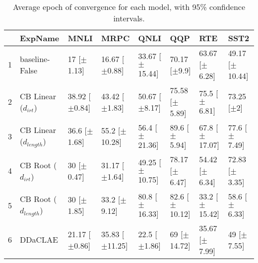 \begin{table}[ht]
\centering
\begin{tabular}{rlllllll}
  \hline
 & ExpName & MNLI & MRPC & QNLI & QQP & RTE & SST2 \\ 
  \hline
1 & baseline-False & 17 [$\pm$1.13] & 16.67 [$\pm$0.88] & 33.67 [$\pm$15.44] & 70.17 [$\pm$9.9] & 63.67 [$\pm$6.28] & 49.17 [$\pm$10.44] \\ 
  2 & CB Linear ($d_{irt}$) & 38.92 [$\pm$0.84] & 43.42 [$\pm$1.83] & 50.67 [$\pm$8.17] & 75.58 [$\pm$5.89] & 75.5 [$\pm$6.81] & 73.25 [$\pm$2] \\ 
  3 & CB Linear ($d_{length}$) & 36.6 [$\pm$1.68] & 55.2 [$\pm$10.28] & 56.4 [$\pm$21.36] & 89.6 [$\pm$5.94] & 67.8 [$\pm$17.07] & 77.6 [$\pm$7.49] \\ 
  4 & CB Root ($d_{irt}$) & 30 [$\pm$0.47] & 31.17 [$\pm$1.64] & 49.25 [$\pm$10.75] & 78.17 [$\pm$6.47] & 54.42 [$\pm$6.34] & 72.83 [$\pm$3.35] \\ 
  5 & CB Root ($d_{length}$) & 30 [$\pm$1.85] & 33.2 [$\pm$9.12] & 80.8 [$\pm$16.33] & 82.6 [$\pm$10.12] & 33.2 [$\pm$15.42] & 58.6 [$\pm$6.33] \\ 
  6 & DDaCLAE & 21.17 [$\pm$0.86] & 35.83 [$\pm$11.25] & 22.5 [$\pm$1.86] & 69 [$\pm$14.72] & 35.67 [$\pm$7.99] & 49 [$\pm$7.55] \\ 
   \hline
\end{tabular}
\caption{Average epoch of convergence for each model, with 95\% confidence intervals.} 
\end{table}
